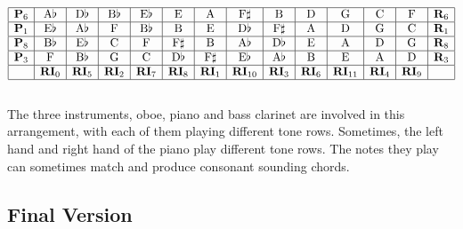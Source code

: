 \documentclass{article}
\begin{document}
\[\begin{array}{|c|c|c|c|c|c|c|c|c|c|c|c|c|c|}
\hline
\mathbf{P}_6&\mathrm{A}\flat&\mathrm{D}\flat&\mathrm{B}\flat&\mathrm{E}\flat&\mathrm{E}&\mathrm{A}&\mathrm{F}\sharp&\mathrm{B}&\mathrm{D}&\mathrm{G}&\mathrm{C}&\mathrm{F}&\mathbf{R}_6\\
\hline
\mathbf{P}_1&\mathrm{E}\flat&\mathrm{A}\flat&\mathrm{F}&\mathrm{B}\flat&\mathrm{B}&\mathrm{E}&\mathrm{D}\flat&\mathrm{F}\sharp&\mathrm{A}&\mathrm{D}&\mathrm{G}&\mathrm{C}&\mathbf{R}_1\\
\hline
\mathbf{P}_8&\mathrm{B}\flat&\mathrm{E}\flat&\mathrm{C}&\mathrm{F}&\mathrm{F}\sharp&\mathrm{B}&\mathrm{A}\flat&\mathrm{D}\flat&\mathrm{E}&\mathrm{A}&\mathrm{D}&\mathrm{G}&\mathbf{R}_8\\
\hline
\mathbf{P}_3&\mathrm{F}&\mathrm{B}\flat&\mathrm{G}&\mathrm{C}&\mathrm{D}\flat&\mathrm{F}\sharp&\mathrm{E}\flat&\mathrm{A}\flat&\mathrm{B}&\mathrm{E}&\mathrm{A}&\mathrm{D}&\mathbf{R}_3\\
\hline
&\mathbf{RI}_0&\mathbf{RI}_5&\mathbf{RI}_2&\mathbf{RI}_7&\mathbf{RI}_8&\mathbf{RI}_1&\mathbf{RI}_{10}&\mathbf{RI}_3&\mathbf{RI}_6&\mathbf{RI}_{11}&\mathbf{RI}_4&\mathbf{RI}_9&\\
\hline
\end{array}\]
\\
The three instruments, oboe, piano and bass clarinet are involved in this arrangement, with each of them playing different tone rows. Sometimes, the left hand and right hand of the piano play different tone rows. The notes they play can sometimes match and produce consonant sounding chords.

\subsection{Final Version}


\end{document}
